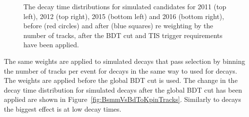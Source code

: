 \begin{figure}[ht]
  \caption{The decay time distributions for \bdkpi simulated candidates for 2011 (top left), 2012 (top right), 2015 (bottom left) and 2016 (bottom right), before (red circles) and after (blue squares) re weighting by the number of tracks, after the BDT cut and TIS trigger requirements have been applied.}
  \label{fig:BdToKpi_weightDecayTime}
\end{figure}


The same weights are applied to simulated \bsmumu decays that pass selection by binning the number of tracks per event for \bsmumu decays in the same way to used for \bdkpi decays. The weights are applied before the global BDT cut is used. The change in the decay time distribution for \bsmuu simulated decays after the global BDT cut has been applied are shown in Figure~\ref{fig:BsmmVsBdToKpinTracks}. Similarly to \bdkpi decays the biggest effect is at low decay times.



